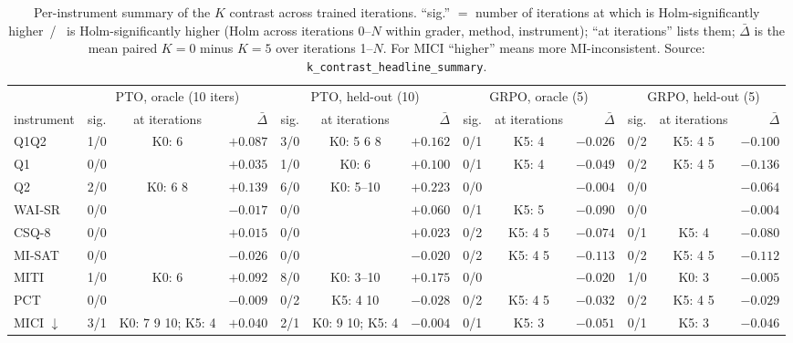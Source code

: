 \begin{table}[t]
  \centering\footnotesize
  \setlength{\tabcolsep}{3pt}
  \begin{tabular}{@{}l ccr ccr ccr ccr@{}}
    \toprule
    & \multicolumn{3}{c}{PTO, oracle (10 iters)} & \multicolumn{3}{c}{PTO, held-out (10)} & \multicolumn{3}{c}{GRPO, oracle (5)} & \multicolumn{3}{c}{GRPO, held-out (5)} \\
    \cmidrule(lr){2-4}\cmidrule(lr){5-7}\cmidrule(lr){8-10}\cmidrule(lr){11-13}
    instrument & sig. & at iterations & $\bar\Delta$ & sig. & at iterations & $\bar\Delta$ & sig. & at iterations & $\bar\Delta$ & sig. & at iterations & $\bar\Delta$ \\
    \midrule
Q1Q2 & 1/0 & \scriptsize K0: 6 & $+0.087$ & 3/0 & \scriptsize K0: 5 6 8 & $+0.162$ & 0/1 & \scriptsize K5: 4 & $-0.026$ & 0/2 & \scriptsize K5: 4 5 & $-0.100$ \\
Q1 & 0/0 &  & $+0.035$ & 1/0 & \scriptsize K0: 6 & $+0.100$ & 0/1 & \scriptsize K5: 4 & $-0.049$ & 0/2 & \scriptsize K5: 4 5 & $-0.136$ \\
Q2 & 2/0 & \scriptsize K0: 6 8 & $+0.139$ & 6/0 & \scriptsize K0: 5--10 & $+0.223$ & 0/0 &  & $-0.004$ & 0/0 &  & $-0.064$ \\
WAI-SR & 0/0 &  & $-0.017$ & 0/0 &  & $+0.060$ & 0/1 & \scriptsize K5: 5 & $-0.090$ & 0/0 &  & $-0.004$ \\
CSQ-8 & 0/0 &  & $+0.015$ & 0/0 &  & $+0.023$ & 0/2 & \scriptsize K5: 4 5 & $-0.074$ & 0/1 & \scriptsize K5: 4 & $-0.080$ \\
MI-SAT & 0/0 &  & $-0.026$ & 0/0 &  & $-0.020$ & 0/2 & \scriptsize K5: 4 5 & $-0.113$ & 0/2 & \scriptsize K5: 4 5 & $-0.112$ \\
MITI & 1/0 & \scriptsize K0: 6 & $+0.092$ & 8/0 & \scriptsize K0: 3--10 & $+0.175$ & 0/0 &  & $-0.020$ & 1/0 & \scriptsize K0: 3 & $-0.005$ \\
PCT & 0/0 &  & $-0.009$ & 0/2 & \scriptsize K5: 4 10 & $-0.028$ & 0/2 & \scriptsize K5: 4 5 & $-0.032$ & 0/2 & \scriptsize K5: 4 5 & $-0.029$ \\
MICI $\downarrow$ & 3/1 & \scriptsize K0: 7 9 10; K5: 4 & $+0.040$ & 2/1 & \scriptsize K0: 9 10; K5: 4 & $-0.004$ & 0/1 & \scriptsize K5: 3 & $-0.051$ & 0/1 & \scriptsize K5: 3 & $-0.046$ \\
    \bottomrule
  \end{tabular}
  \caption{Per-instrument summary of the $K$ contrast across trained iterations. ``sig.'' $=$
    number of iterations at which \Kz{} is Holm-significantly higher~/~\Kf{} is Holm-significantly
    higher (Holm across iterations 0--$N$ within grader, method, instrument); ``at iterations''
    lists them; $\bar\Delta$ is the mean paired $K{=}0$ minus $K{=}5$ over iterations 1--$N$. For
    MICI ``higher'' means more MI-inconsistent. Source: \texttt{k\_contrast\_headline\_summary}.}
  \label{tab:app:summary}
\end{table}

